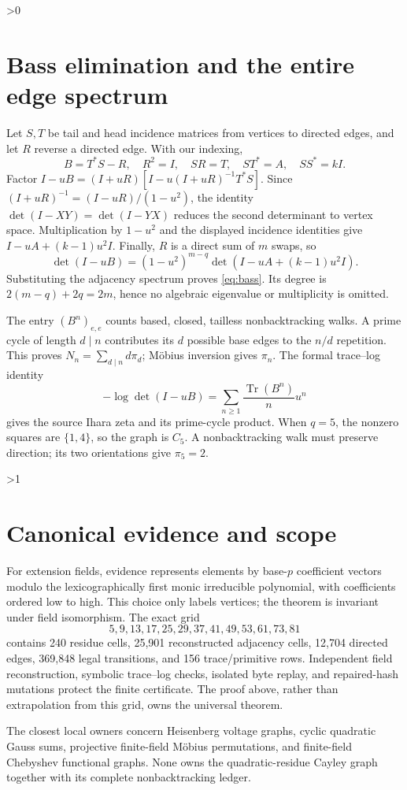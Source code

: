 \documentclass[10pt]{article}
\newcommand{\Tr}{\operatorname{Tr}}
\providecommand{\CRevisionRound}{2}
\begin{document}
\ifnum\CRevisionRound>0
\section{Bass elimination and the entire edge spectrum}
Let $S,T$ be tail and head incidence matrices from vertices to directed edges,
and let $R$ reverse a directed edge.  With our indexing,
\[
 B=T^{\!*}S-R,\quad R^2=I,\quad SR=T,\quad ST^{\!*}=A,
 \quad SS^{\!*}=kI.
\]
Factor $I-uB=(I+uR)[I-u(I+uR)^{-1}T^{\!*}S]$.  Since
$(I+uR)^{-1}=(I-uR)/(1-u^2)$, the identity
$\det(I-XY)=\det(I-YX)$ reduces the second determinant to vertex space.
Multiplication by $1-u^2$ and the displayed incidence identities give
$I-uA+(k-1)u^2I$.  Finally, $R$ is a direct sum of $m$ swaps, so
\[
 \det(I-uB)=(1-u^2)^{m-q}\det(I-uA+(k-1)u^2I).
\]
Substituting the adjacency spectrum proves \eqref{eq:bass}.  Its degree is
$2(m-q)+2q=2m$, hence no algebraic eigenvalue or multiplicity is omitted.

The entry $(B^n)_{e,e}$ counts based, closed, tailless nonbacktracking walks.
A prime cycle of length $d\mid n$ contributes its $d$ possible base edges to
the $n/d$ repetition.  This proves $N_n=\sum_{d\mid n}d\pi_d$; M\"obius
inversion gives $\pi_n$.  The formal trace--log identity
\[
 -\log\det(I-uB)=\sum_{n\ge1}\frac{\Tr(B^n)}n u^n
\]
gives the source Ihara zeta and its prime-cycle product.  When $q=5$, the
nonzero squares are $\{1,4\}$, so the graph is $C_5$.  A nonbacktracking walk
must preserve direction; its two orientations give $\pi_5=2$.
\fi

\ifnum\CRevisionRound>1
\section{Canonical evidence and scope}
For extension fields, evidence represents elements by base-$p$ coefficient
vectors modulo the lexicographically first monic irreducible polynomial, with
coefficients ordered low to high.  This choice only labels vertices; the
theorem is invariant under field isomorphism.  The exact grid
\[
5,9,13,17,25,29,37,41,49,53,61,73,81
\]
contains 240 residue cells, 25,901 reconstructed adjacency cells, 12,704
directed edges, 369,848 legal transitions, and 156 trace/primitive rows.
Independent field reconstruction, symbolic trace--log checks, isolated byte
replay, and repaired-hash mutations protect the finite certificate.  The proof
above, rather than extrapolation from this grid, owns the universal theorem.

The closest local owners concern Heisenberg voltage graphs, cyclic quadratic
Gauss sums, projective finite-field M\"obius permutations, and finite-field
Chebyshev functional graphs.  None owns the quadratic-residue Cayley graph
together with its complete nonbacktracking ledger.
\end{document}
